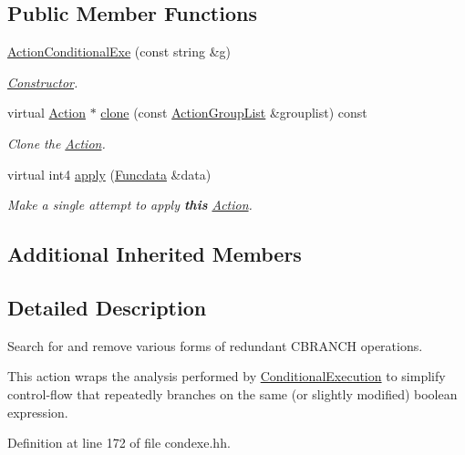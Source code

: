 \subsection*{Public Member Functions}
\begin{DoxyCompactItemize}
\item 
\mbox{\hyperlink{class_action_conditional_exe_a01cbfc30f3bac447a947d2d0d3ef0fd8}{Action\+Conditional\+Exe}} (const string \&g)
\begin{DoxyCompactList}\small\item\em \mbox{\hyperlink{class_constructor}{Constructor}}. \end{DoxyCompactList}\item 
virtual \mbox{\hyperlink{class_action}{Action}} $\ast$ \mbox{\hyperlink{class_action_conditional_exe_af0f575a8caa8a1dce2557f5abddec8e4}{clone}} (const \mbox{\hyperlink{class_action_group_list}{Action\+Group\+List}} \&grouplist) const
\begin{DoxyCompactList}\small\item\em Clone the \mbox{\hyperlink{class_action}{Action}}. \end{DoxyCompactList}\item 
virtual int4 \mbox{\hyperlink{class_action_conditional_exe_a8625b7608a9c03ab7a70b1a7ae4d34ea}{apply}} (\mbox{\hyperlink{class_funcdata}{Funcdata}} \&data)
\begin{DoxyCompactList}\small\item\em Make a single attempt to apply {\bfseries{this}} \mbox{\hyperlink{class_action}{Action}}. \end{DoxyCompactList}\end{DoxyCompactItemize}
\subsection*{Additional Inherited Members}


\subsection{Detailed Description}
Search for and remove various forms of redundant C\+B\+R\+A\+N\+CH operations. 

This action wraps the analysis performed by \mbox{\hyperlink{class_conditional_execution}{Conditional\+Execution}} to simplify control-\/flow that repeatedly branches on the same (or slightly modified) boolean expression. 

Definition at line 172 of file condexe.\+hh.



